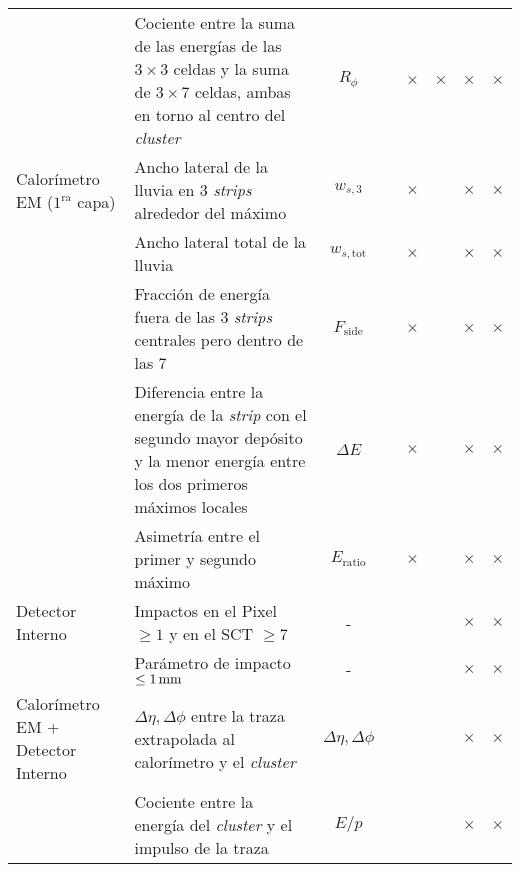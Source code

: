 \begin{table}[!htbp]
\begin{tabular}{y{3cm} p{7cm} c | cc | ccc}
                 & Cociente entre la suma de las energías de las
                   $3\times 3$ celdas y la suma de $3\times 7$
                   celdas, ambas en torno al centro del \emph{cluster}     & $R_\phi$                &   & $\times$ & $\times$ & $\times$ & $\times$ \\


   Calorímetro EM ($1^\mathrm{ra}$ capa) & Ancho lateral de la lluvia en 3 \emph{strips} alrededor
                  del máximo                                        & $w_{s,3}$               &   & $\times$ &   & $\times$ & $\times$ \\

                & Ancho lateral total de la lluvia                  & $w_{s,\mathrm{tot}}$    &   & $\times$ &   & $\times$ & $\times$ \\

                & Fracción de energía fuera de las 3 \emph{strips}
                  centrales pero dentro de las 7                    & $F_{\mathrm{side}}$     &   & $\times$ &   & $\times$ & $\times$ \\

                & Diferencia entre la energía de la \emph{strip} con el
                  segundo mayor depósito y la menor energía entre
                  los dos primeros máximos locales                  & $\Delta E$              &   & $\times$ &   & $\times$ & $\times$ \\

                & Asimetría entre el primer y segundo máximo        & $E_{\mathrm{ratio}}$    &   & $\times$ &   & $\times$ & $\times$ \\


  Detector Interno            & Impactos en el Pixel $\geq 1$ y en el
                  SCT $\geq 7$                                      & -                       &   &   &   & $\times$ & $\times$ \\

                & Parámetro de impacto $\leq \unit[1]{mm}$          & -                       &   &   &   & $\times$ & $\times$ \\


  Calorímetro EM +
  Detector Interno         & $\Delta\eta,\Delta\phi$ entre la traza
                  extrapolada al calorímetro y el \emph{cluster}           & $\Delta\eta,\Delta\phi$ &  &   &   & $\times$ & $\times$ \\

                & Cociente entre la energía del \emph{cluster} y el impulso
                  de la traza                                       & $E/p$                   &  &   &   & $\times$ & $\times$ \\



\end{tabular}
\end{table}
